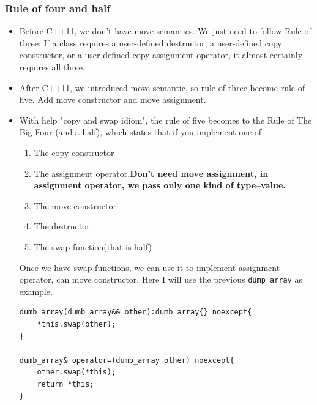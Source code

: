 \documentclass[a4paper,11pt,twoside]{book}
\begin{document}
\subsubsection{Rule of four and half}
\begin{itemize}
		\item Before C++11, we don't have move semantics. We just need to follow Rule of three: If a class requires a user-defined destructor, a user-defined copy constructor, or a user-defined copy assignment operator, it almost certainly requires all three.
	
	\item After C++11, we introduced move semantic, so rule of three become rule of five. Add move constructor and move assignment.
	
	\item With help "copy and swap idiom", the rule of five becomes to the Rule of The Big Four (and a half), which states that if you implement one of
	\begin{enumerate}
		\item The copy constructor
		\item The assignment operator.\textbf{Don't need move assignment, in assignment operator, we pass only one kind of type--value.} 
		\item The move constructor
		\item The destructor
		\item The swap function(that is half)
	\end{enumerate}
    Once we have swap functions, we can use it to implement assignment operator, can move constructor. Here I will use the previous \texttt{dump\_array} as example. 
\begin{lstlisting}[numbers=none]
dumb_array(dumb_array&& other):dumb_array{} noexcept{
    *this.swap(other);
}

dumb_array& operator=(dumb_array other) noexcept{
    other.swap(*this); 
    return *this;
}
\end{lstlisting}
	
\end{itemize}
\end{document}
